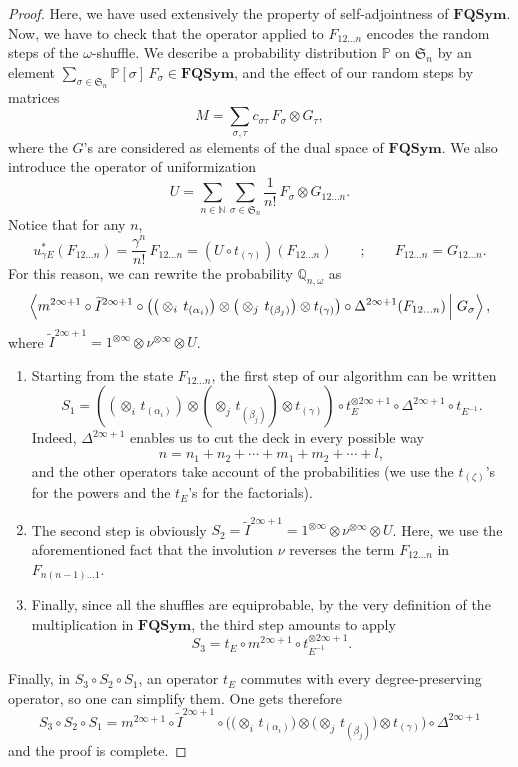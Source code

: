 \documentclass[smallextended,nospthms]{svjour3}
\theoremstyle{remark}
\newcommand{\N}{\mathbb{N}}
\newcommand{\sym}{\mathfrak{S}}
\newcommand{\FQSym}{\mathbf{FQSym}}
\newcommand{\proba}{\mathbb{P}}
\newcommand{\qproba}{\mathbb{Q}}
\newcommand{\scal}[2]{\left\langle #1\vphantom{#2}\,\right |\left.#2 \vphantom{#1}\right\rangle}
\begin{document}
\begin{proof}
Here, we have used extensively the property of self-adjointness of $\FQSym$. Now, we have to check that the operator applied to $F_{12\ldots n}$ encodes the random steps of the $\omega$-shuffle. We describe a probability distribution $\proba$ on $\sym_{n}$ by an element $\sum_{\sigma \in \sym_{n}}\proba[\sigma]\,F_{\sigma} \in \FQSym$, and the effect of our random steps by matrices
$$M=\sum_{\sigma,\tau}c_{\sigma\tau}\,F_{\sigma}\otimes G_{\tau},$$
where the $G$'s are considered as elements of the dual space of $\FQSym$.  We also introduce the operator of uniformization
$$U=\sum_{n\in \N}\sum_{\sigma\in \sym_{n}}\frac{1}{n!}\,F_{\sigma}\otimes G_{12\ldots n}.$$
Notice that for any $n$,
$$u_{\gamma E}^{*}(F_{12\ldots n})=\frac{\gamma^{n}}{n!}\,F_{12\ldots n}=(U \circ t_{(\gamma)})(F_{12\ldots n})\qquad;\qquad F_{12\ldots n}=G_{12\ldots n}.$$
For this reason, we can rewrite the probability $\qproba_{n,\omega}$ as
$$\scal{m^{2\infty+1} \circ \widetilde{I}^{2\infty+1} \circ \big(\big(\otimes_{i}\,t_{(\alpha_{i})}\big) \otimes \big(\otimes_{j}\,t_{(\beta_{j})}\big) \otimes t_{(\gamma)}\big) \circ \Delta^{2 \infty +1}(F_{12\ldots n})}{G_{\sigma}},$$
where $\widetilde{I}^{2\infty+1}=1^{\otimes \infty}\otimes \nu^{\otimes \infty} \otimes U$.\vspace{2mm}
\begin{enumerate}
\item Starting from the state $F_{12\ldots n}$, the first step of our algorithm can be written
$$S_{1}=\left(\left(\otimes_{i}\,t_{(\alpha_{i})}\right) \otimes \left(\otimes_{j}\,t_{(\beta_{j})}\right) \otimes t_{(\gamma)}\right) \circ t_{E}^{\otimes 2\infty+1} \circ \Delta^{2\infty+1} \circ t_{E^{-1}}.$$
Indeed, $\Delta^{2\infty+1}$ enables us to cut the deck in every possible way 
$$n=n_{1}+n_{2}+\cdots+m_{1}+m_{2}+\cdots+l,$$ and the other operators take account of the probabilities (we use the $t_{(\zeta)}$'s for the powers and the $t_{E}$'s for the factorials).\vspace{2mm}
\item The second step is obviously $S_{2}=\widetilde{I}^{2\infty+1}=1^{\otimes \infty}\otimes \nu^{\otimes \infty} \otimes U$.
Here, we use the aforementioned fact that the involution $\nu$ reverses the term $F_{12\ldots n}$ in $F_{n(n-1)\ldots 1}$.\vspace{2mm}
\item Finally, since all the shuffles are equiprobable, by the very definition of the multiplication in $\FQSym$, the third step amounts to apply $$S_{3}=t_{E}\circ m^{2\infty +1} \circ t_{E^{-1}}^{\otimes 2\infty +1}.$$ \vspace{2mm}
\end{enumerate}
Finally, in $S_{3}\circ S_{2}\circ S_{1}$, an operator $t_{E}$ commutes with every degree-preserving operator, so one can simplify them. One gets therefore
$$S_{3}\circ S_{2}\circ S_{1}=m^{2\infty+1} \circ \widetilde{I}^{2\infty+1} \circ \big(\big(\otimes_{i}\,t_{(\alpha_{i})}\big) \otimes \big(\otimes_{j}\,t_{(\beta_{j})}\big) \otimes t_{(\gamma)}\big) \circ \Delta^{2 \infty +1}$$
and the proof is complete.
\end{proof}
\bigskip
\end{document}
